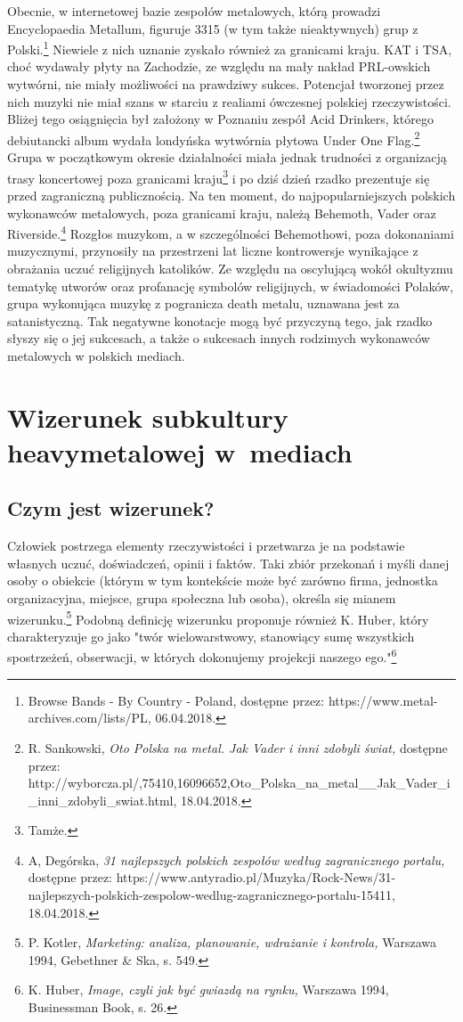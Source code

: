 \documentclass[12pt, a4paper, titlepage]{report}
\begin{document}
Obecnie, w internetowej bazie zespołów metalowych, którą prowadzi Encyclopaedia Metallum, figuruje 3315 (w tym także nieaktywnych) grup z Polski.\footnote{Browse Bands - By Country - Poland, dostępne przez: https://www.metal-archives.com/lists/PL, 06.04.2018.} Niewiele z nich uznanie zyskało również za granicami kraju. KAT i TSA, choć wydawały płyty na Zachodzie, ze względu na mały nakład PRL-owskich wytwórni, nie miały możliwości na prawdziwy sukces. Potencjał tworzonej przez nich muzyki nie miał szans w starciu z realiami ówczesnej polskiej rzeczywistości. Bliżej tego osiągnięcia był założony w Poznaniu zespół Acid Drinkers, którego debiutancki album wydała londyńska wytwórnia płytowa Under One Flag.\footnote{R. Sankowski, \textit{Oto Polska na metal. Jak Vader i inni zdobyli świat,} dostępne przez: http://wyborcza.pl/,75410,16096652,Oto_Polska_na_metal__Jak_Vader_i_inni_zdobyli_swiat.html, 18.04.2018.} Grupa w początkowym okresie działalności miała jednak trudności z organizacją trasy koncertowej poza granicami kraju\footnote{Tamże.} i po dziś dzień rzadko prezentuje się przed zagraniczną publicznością. Na ten moment, do najpopularniejszych polskich wykonawców metalowych, poza granicami kraju, należą Behemoth, Vader oraz Riverside.\footnote{A, Degórska, \textit{31 najlepszych polskich zespołów według zagranicznego portalu,} dostępne przez: https://www.antyradio.pl/Muzyka/Rock-News/31-najlepszych-polskich-zespolow-wedlug-zagranicznego-portalu-15411, 18.04.2018.} Rozgłos muzykom, a w szczególności Behemothowi, poza dokonaniami muzycznymi, przynosiły na przestrzeni lat liczne kontrowersje wynikające z obrażania uczuć religijnych katolików. Ze względu na oscylującą wokół okultyzmu tematykę utworów oraz profanację symbolów religijnych, w świadomości Polaków, grupa wykonująca muzykę z pogranicza death metalu, uznawana jest za satanistyczną. Tak negatywne konotacje mogą być przyczyną tego, jak rzadko słyszy się o jej sukcesach, a także o sukcesach innych rodzimych wykonawców metalowych w polskich mediach. 

\chapter{Wizerunek subkultury heavymetalowej w~mediach}
\section{Czym jest wizerunek?}
Człowiek postrzega elementy rzeczywistości i przetwarza je na podstawie własnych uczuć, doświadczeń, opinii i faktów. Taki zbiór przekonań i myśli danej osoby o obiekcie (którym w tym kontekście może być zarówno firma, jednostka organizacyjna, miejsce, grupa społeczna lub osoba), określa się mianem wizerunku.\footnote{P. Kotler, \textit{Marketing: analiza, planowanie, wdrażanie i kontrola,} Warszawa 1994, Gebethner \& Ska, s. 549.} Podobną definicję wizerunku proponuje również K. Huber, który charakteryzuje go jako "twór wielowarstwowy, stanowiący sumę wszystkich spostrzeżeń, obserwacji, w których dokonujemy projekcji naszego ego."\footnote{K. Huber, \textit{Image, czyli jak być gwiazdą na rynku,} Warszawa 1994, Businessman Book, s. 26.} 
\end{document}
